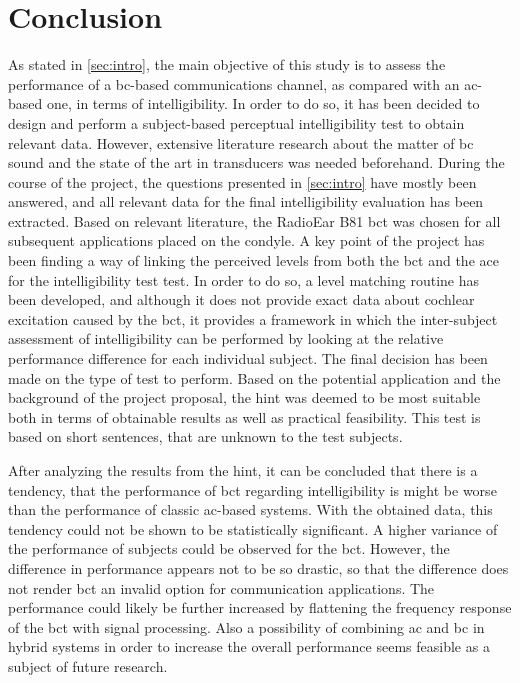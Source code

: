 \section{Conclusion}\label{sec:conclusion}
As stated in \autoref{sec:intro}, the main objective of this study is to assess the performance of a \gls{bc}-based communications channel, as compared with an \gls{ac}-based one, in terms of intelligibility.
In order to do so, it has been decided to design and perform a subject-based perceptual intelligibility test to obtain relevant data. However, extensive literature research about the matter of \gls{bc} sound and the state of the art in transducers was needed beforehand.
During the course of the project, the questions presented in \autoref{sec:intro} have mostly been answered, and all relevant data for the final intelligibility evaluation has been extracted.
Based on relevant literature, the RadioEar B81 \gls{bct} was chosen for all subsequent applications placed on the condyle.
A key point of the project has been finding a way of linking the perceived levels from both the \gls{bct} and the \gls{ace} for the intelligibility test test. 
In order to do so, a level matching routine has been developed, and although it does not provide exact data about cochlear excitation caused by the \gls{bct}, it provides a framework in which the inter-subject assessment of intelligibility can be performed by looking at the relative performance difference for each individual subject. 
The final decision has been made on the type of test to perform. Based on the potential application and the background of the project proposal, the \gls{hint} was deemed to be most suitable both in terms of obtainable results as well as practical feasibility. This test is based on short sentences, that are unknown to the test subjects.

After analyzing the results from the \gls{hint}, it can be concluded that there is a tendency, that the performance of \gls{bct} regarding intelligibility is might be worse than the performance of classic \gls{ac}-based systems. 
With the obtained data, this tendency could not be shown to be statistically significant. A higher variance of the performance of subjects could be observed for the \gls{bct}.
However, the difference in performance appears not to be so drastic, so that the difference does not render \gls{bct} an invalid option for communication applications. The performance could likely be further increased by flattening the frequency response of the \gls{bct} with signal processing. Also a possibility of combining \gls{ac} and \gls{bc} in hybrid systems in order to increase the overall performance seems feasible as a subject of future research.





